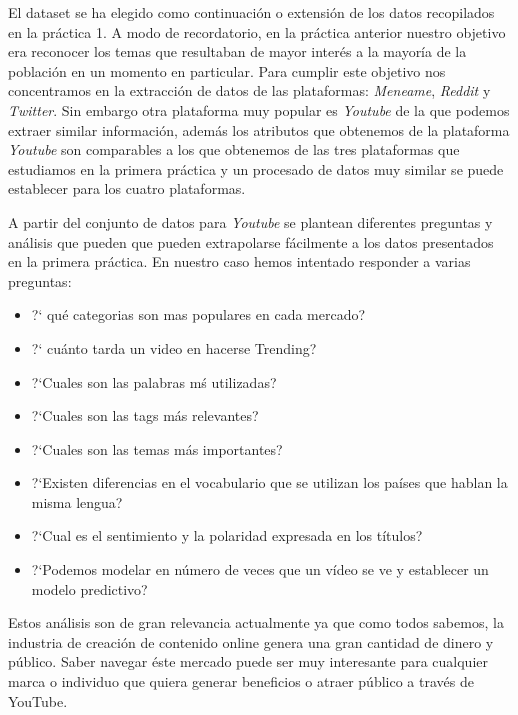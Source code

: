 \documentclass[a4paper,12pt]{article}
\begin{document}
El dataset se ha elegido como continuaci\'on o extensi\'on de los datos recopilados en la pr\'actica 1. A modo de recordatorio, en la pr\'actica anterior nuestro objetivo era reconocer los temas que resultaban de mayor inter\'es a la mayor\'ia de la poblaci\'on en un momento en particular. Para cumplir este objetivo nos concentramos en la extracci\'on de datos de las plataformas:  {\itshape Meneame}, {\itshape Reddit} y {\itshape Twitter}. Sin embargo otra plataforma muy popular es {\itshape Youtube} de la que podemos extraer similar informaci\'on, adem\'as los atributos que obtenemos de la plataforma {\itshape Youtube} son comparables a los que obtenemos de las tres plataformas que estudiamos en la primera pr\'actica y un procesado de datos muy similar se puede establecer para los cuatro plataformas.

A partir del conjunto de datos para  {\itshape Youtube}  se plantean diferentes preguntas y an\'alisis que pueden que pueden extrapolarse f\'acilmente a los datos presentados en la primera pr\'actica. En nuestro caso hemos intentado responder a varias preguntas:

\begin{itemize}

\item  ?` qu\'e categorias son mas populares en cada mercado?
\item ?` cu\'anto tarda un video en hacerse Trending?
\item ?`Cuales son las palabras m\'s utilizadas?
\item ?`Cuales son las tags m\'as relevantes?
\item ?`Cuales son las temas m\'as importantes?
\item ?`Existen diferencias en el vocabulario que se utilizan los pa\'ises que hablan la misma lengua?
\item ?`Cual es el sentimiento y la polaridad expresada en los t\'itulos?
\item ?`Podemos modelar en n\'umero de veces que un v\'ideo se ve y establecer un modelo predictivo?

\end{itemize}

Estos an\'alisis son de gran relevancia actualmente ya que como todos sabemos, la industria de creaci\'on de contenido online genera una gran cantidad de dinero y p\'ublico. Saber navegar \'este mercado puede ser muy interesante para cualquier marca o individuo que quiera generar beneficios o atraer p\'ublico a trav\'es de YouTube.
\end{document}
